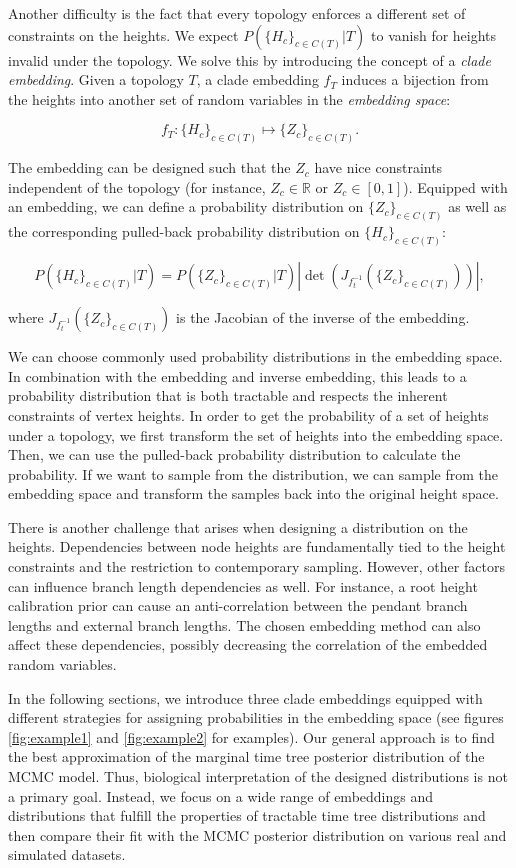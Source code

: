 \documentclass[10pt,letterpaper]{article}
\begin{document}
Another difficulty is the fact that every topology enforces a different set of constraints on the heights. We expect $P\left(\{H_c\}_{c \in C(T)} | T\right)$ to vanish for heights invalid under the topology. We solve this by introducing the concept of a \emph{clade embedding}. Given a topology $T$, a clade embedding $f_T$ induces a bijection from the heights into another set of random variables in the \emph{embedding space}:

$$
f_T: \{H_c\}_{c \in C(T)} \mapsto \{Z_c\}_{c \in C(T)}.
$$

The embedding can be designed such that the $Z_c$ have nice constraints independent of the topology (for instance, $Z_c \in \mathbb{R}$ or $Z_c \in [0, 1]$). Equipped with an embedding, we can define a probability distribution on $\{Z_c\}_{c \in C(T)}$ as well as the corresponding pulled-back probability distribution on $\{H_c\}_{c \in C(T)}$:

$$
P\left(\{H_c\}_{c \in C(T)} | T\right) = P\left(\{Z_c\}_{c \in C(T)} | T\right) \left| \det{\left(J_{f_t^{-1}}(\{Z_c\}_{c \in C(T)})\right)} \right|,
$$

where $J_{f_t^{-1}}(\{Z_c\}_{c \in C(T)})$ is the Jacobian of the inverse of the embedding.

We can choose commonly used probability distributions in the embedding space. In combination with the embedding and inverse embedding, this leads to a probability distribution that is both tractable and respects the inherent constraints of vertex heights. In order to get the probability of a set of heights under a topology, we first transform the set of heights into the embedding space. Then, we can use the pulled-back probability distribution to calculate the probability. If we want to sample from the distribution, we can sample from the embedding space and transform the samples back into the original height space.

There is another challenge that arises when designing a distribution on the heights. Dependencies between node heights are fundamentally tied to the height constraints and the restriction to contemporary sampling. However, other factors can influence branch length dependencies as well. For instance, a root height calibration prior can cause an anti-correlation between the pendant branch lengths and external branch lengths. The chosen embedding method can also affect these dependencies, possibly decreasing the correlation of the embedded random variables.

In the following sections, we introduce three clade embeddings equipped with different strategies for assigning probabilities in the embedding space (see figures \ref{fig:example1} and \ref{fig:example2} for examples). Our general approach is to find the best approximation of the marginal time tree posterior distribution of the MCMC model. Thus, biological interpretation of the designed distributions is not a primary goal. Instead, we focus on a wide range of embeddings and distributions that fulfill the properties of tractable time tree distributions and then compare their fit with the MCMC posterior distribution on various real and simulated datasets.
\end{document}

